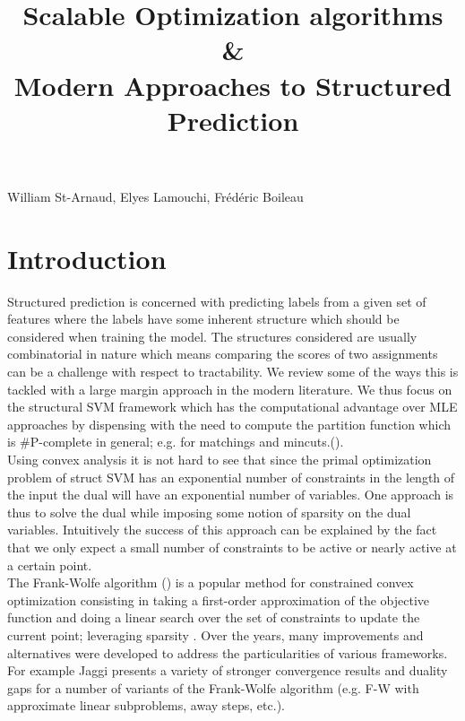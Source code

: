 \documentclass{article}
\title{Scalable Optimization algorithms\\ \& \\ Modern Approaches to Structured
Prediction}
\date{}
\begin{document}
 

\maketitle


\vspace{-0.5in}
\begin{center}
William St-Arnaud, Elyes Lamouchi, Fr\'ed\'eric Boileau
\end{center}
\vspace{0.2in}


\section*{Introduction}

Structured prediction is concerned with predicting labels from a given
set of features where the labels have some inherent structure which should
be considered when training the model. The structures considered are usually
combinatorial in nature which means comparing the scores of two assignments
can be a challenge with respect to tractability. We review some of the ways
this is tackled with a large margin approach in the modern literature.
We thus focus on the structural SVM framework which has the computational
advantage over MLE approaches by dispensing with the need to compute the
partition function which is \#P-complete in general; e.g. for
matchings and mincuts.(\cite{dualextraSimon}).\\

Using convex analysis it is not hard to see that since the primal optimization
problem of struct SVM has an exponential number of constraints in the length of
the input the dual will have an exponential number of variables. One approach is
thus to solve the dual while imposing some notion of sparsity on the dual
variables. Intuitively the success of this approach can be explained by the fact
that we only expect a small number of constraints to be active or nearly active
at a certain point. \\




The Frank-Wolfe algorithm (\cite{f-w}) is a popular method for constrained
convex optimization consisting in taking a first-order approximation of the
objective function and doing a linear search over the set of constraints to
update the current point; leveraging sparsity . Over the years, many
improvements and alternatives were developed to address the particularities of
various frameworks. For example Jaggi \cite{Jaggi:229246} presents a variety of
stronger convergence results and duality gaps for a number of variants of the
Frank-Wolfe algorithm
(e.g. F-W with approximate linear subproblems, away steps, etc.).\\
\end{document}
